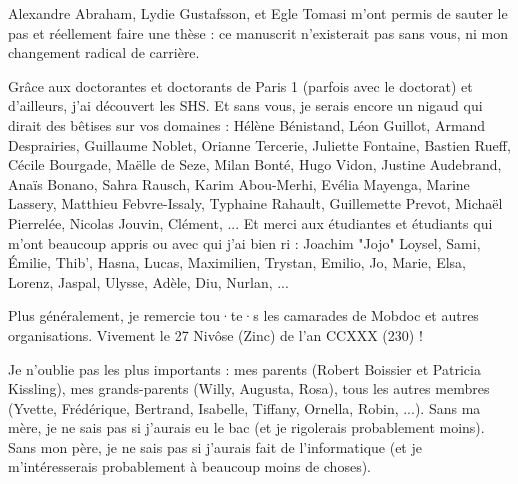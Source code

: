\begin{small}
\smallskip

Alexandre Abraham, Lydie Gustafsson, et Egle Tomasi m'ont permis de sauter le pas et réellement faire une thèse : ce manuscrit n'existerait pas sans vous, ni mon changement radical de carrière.

\smallskip

Grâce aux doctorantes et doctorants de Paris 1 (parfois avec le doctorat) et d'ailleurs, j'ai découvert les SHS.
Et sans vous, je serais encore un nigaud qui dirait des bêtises sur vos domaines : Hélène Bénistand, Léon Guillot, Armand Desprairies, Guillaume Noblet, Orianne Tercerie, Juliette Fontaine, Bastien Rueff, Cécile Bourgade, Maëlle de Seze, Milan Bonté, Hugo Vidon, Justine Audebrand, Anaïs Bonano, Sahra Rausch, Karim Abou-Merhi, Evélia Mayenga, Marine Lassery, Matthieu Febvre-Issaly, Typhaine Rahault, Guillemette Prevot, Michaël Pierrelée, Nicolas Jouvin, Clément, ...
Et merci aux étudiantes et étudiants qui m'ont beaucoup appris ou avec qui j'ai bien ri : Joachim "Jojo" Loysel, Sami, Émilie, Thib', Hasna, Lucas, Maximilien, Trystan, Emilio, Jo, Marie, Elsa, Lorenz, Jaspal, Ulysse, Adèle, Diu, Nurlan, ...

Plus généralement, je remercie tou·te·s les camarades de Mobdoc et autres organisations.
Vivement le 27 Nivôse (Zinc) de l'an CCXXX (230) !

\smallskip

Je n'oublie pas les plus importants : mes parents (Robert Boissier et Patricia Kissling), mes grands-parents (Willy, Augusta, Rosa), tous les autres membres (Yvette, Frédérique, Bertrand, Isabelle, Tiffany, Ornella, Robin, ...).
Sans ma mère, je ne sais pas si j'aurais eu le bac (et je rigolerais probablement moins).
Sans mon père, je ne sais pas si j'aurais fait de l'informatique (et je m'intéresserais probablement à beaucoup moins de choses).

\end{small}

